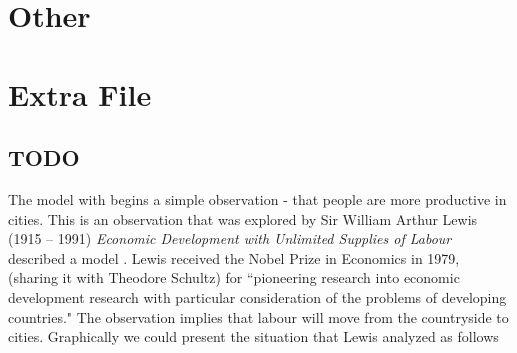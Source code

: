 \part{Other}










\part{Extra File}

\chapter{TODO}

The model with begins a simple observation - that people are more productive in cities. This is an observation that was explored by Sir William Arthur Lewis (1915 -- 1991)  \emph{Economic Development with Unlimited Supplies of Labour} described a model 
\cite{Lewis1954EconomicDW}. Lewis received the Nobel Prize in Economics in 1979, (sharing it with Theodore Schultz) for ``pioneering research into economic development research with particular consideration of the problems of developing countries." The observation implies that labour will move from the countryside to cities.  Graphically we could present the situation that Lewis analyzed as follows


